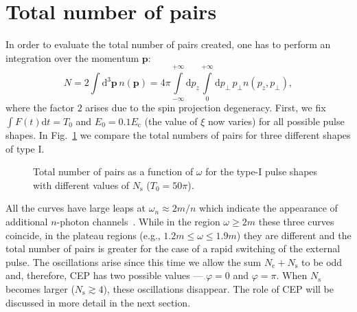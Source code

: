\documentclass[preprint,aps,prd,showpacs,floatfix]{revtex4-1}
\begin{document}
\section{Total number of pairs}\label{sec:total}
In order to evaluate the total number of pairs created, one has to perform an integration over the momentum $\boldsymbol{p}$:
%
\begin{equation}
N = 2 \int \! \mathrm{d}^3 \boldsymbol{p} \, n(\boldsymbol{p}) = 4\pi \int \limits_{-\infty}^{+\infty}\! \mathrm{d} p_z \int \limits_{0}^{+\infty}\! \mathrm{d} p_\perp \, p_\perp n(p_z, p_\perp),
\label{eq:total_integral}
\end{equation}
%
where the factor $2$ arises due to the spin projection degeneracy. First, we fix $\int F(t) \mathrm{d} t = T_0$ and $E_0 = 0.1 E_\text{c}$ (the value of $\xi$ now varies) for all possible pulse shapes. In Fig.~\ref{fig:total} we compare the total numbers of pairs for three different shapes of type I.
%
\begin{figure}[h]
\caption{Total number of pairs as a function of $\omega$ for the type-I pulse shapes with different values of $N_\text{s}$ ($T_0 = 50 \pi$).}
\label{fig:total}
\end{figure}
%
All the curves have large leaps at $\omega_n \approx 2m/n$ which indicate the appearance of additional $n$-photon channels~\cite{abdukerim_plb_2013}. While in the region $\omega \geq 2m$ these three curves coincide, in the plateau regions (e.g., $1.2m \leq \omega \leq 1.9m$) they are different and the total number of pairs is greater for the case of a rapid switching of the external pulse. The oscillations arise since this time we allow the sum $N_\text{c} + N_\text{s}$ to be odd and, therefore, CEP has two possible values --- $\varphi = 0$ and $\varphi = \pi$. When $N_\text{s}$ becomes larger ($N_\text{s} \gtrsim 4$), these oscillations disappear. The role of CEP will be discussed in more detail in the next section.
\end{document}

